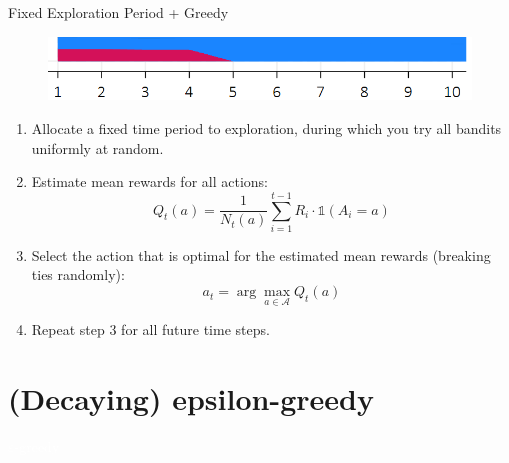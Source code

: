 \documentclass[11pt,table]{beamer}
\begin{document}
\begin{frame}{Fixed Exploration Period + Greedy}
\begin{figure}
    \centering
    \includegraphics[width=0.9\linewidth]{figures/epsilon first 2.png}
\end{figure}
    \begin{tcolorbox}[colframe=black, boxrule=1pt, sharp corners, ]
        \begin{enumerate}\small 
            \item Allocate a fixed time period to exploration, during which you try all bandits uniformly at random.\pause
            \item Estimate mean rewards for all actions:
            \[
                Q_t(a) = \frac{1}{N_t(a)} \sum_{i=1}^{t-1} R_i \cdot \mathds{1}(A_i = a)
            \]\vspace*{-2ex}\pause
            \item Select the action that is optimal for the estimated mean rewards (breaking ties randomly):
            \[
                a_t = \arg\max_{a \in \mathcal{A}} Q_t(a)
            \]\vspace*{-2.5ex}\pause
            \item Repeat step 3 for all future time steps.
        \end{enumerate}
    \end{tcolorbox}
\end{frame}


\section{(Decaying) epsilon-greedy}
{
\begin{frame}
\centering
\Huge
\textcolor{white}{$\varepsilon$-greedy}
\thispagestyle{empty}
\end{frame}
}
\end{document}
